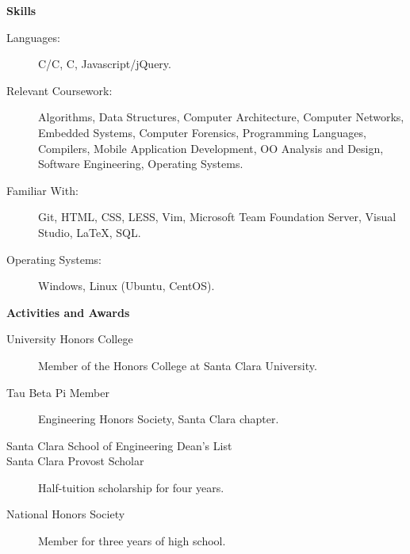 \documentclass[letterpaper,11pt]{article}
\newcommand{\resheading}[1]{{\large \colorbox{mygrey}{\begin{minipage}{\textwidth}{\textbf{#1 \vphantom{p\^{E}}}}\end{minipage}}}}
\newcommand{\CC}{C\nolinebreak\hspace{-.05em}\raisebox{.4ex}{\tiny\bf +}\nolinebreak\hspace{-.10em}\raisebox{.4ex}{\tiny\bf +}}
\newcommand{\CS}{C\nolinebreak\hspace{-.05em}\raisebox{.4ex}{\scriptsize\bf \#}}
\begin{document}
\resheading{Skills}

\begin{description}
\item[Languages:]
C/\CC, \CS, Javascript/jQuery.
\item[Relevant Coursework:]
Algorithms, Data Structures, Computer Architecture, Computer Networks, Embedded Systems, Computer Forensics, Programming Languages, Compilers, Mobile Application Development, OO Analysis and Design, Software Engineering, Operating Systems. 
\item[Familiar With:]
Git, HTML, CSS, LESS, Vim, Microsoft Team Foundation Server, Visual Studio, \LaTeX, SQL.
\item[Operating Systems:]
Windows, Linux (Ubuntu, CentOS).
\end{description}

\resheading{Activities and Awards}

\begin{description}
\item[University Honors College]
Member of the Honors College at Santa Clara University.
\item[Tau Beta Pi Member]
Engineering Honors Society, Santa Clara chapter.
\item[Santa Clara School of Engineering Dean's List]
\item[Santa Clara Provost Scholar]
Half-tuition scholarship for four years.
\item[National Honors Society]
Member for three years of high school.
\end{description}



\end{document}
